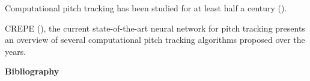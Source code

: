 \documentclass[letter,11pt]{report}
\begin{document}
Computational pitch tracking has been studied for at least half a century (\cite{nollcepstrum}).

CREPE (\cite{crepe}), the current state-of-the-art neural network for pitch tracking presents an overview of several computational pitch tracking algorithms proposed over the years. 

\vfill
\clearpage

\noindent\LARGE{\textbf{Bibliography}}\\

\vspace{-0.5em}

\printbibliography[heading=none]
\end{document}

